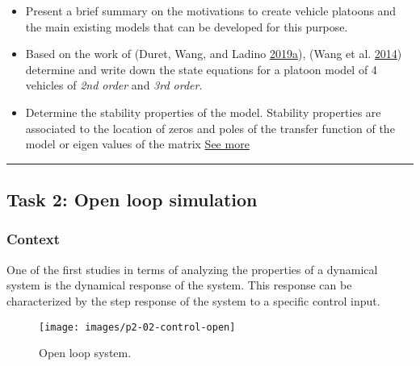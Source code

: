 \documentclass[]{book}
\providecommand{\tightlist}{%
  \setlength{\itemsep}{0pt}\setlength{\parskip}{0pt}}
\theoremstyle{definition}
\theoremstyle{definition}
\theoremstyle{definition}
\theoremstyle{remark}
\begin{document}
\begin{itemize}
\tightlist
\item
  Present a brief summary on the motivations to create vehicle platoons
  and the main existing models that can be developed for this purpose.
\item
  Based on the work of (Duret, Wang, and Ladino
  \protect\hyperlink{ref-Duret2019:ISTTT}{2019}\protect\hyperlink{ref-Duret2019:ISTTT}{a}),
  (Wang et al. \protect\hyperlink{ref-Meng2014b:TR-C}{2014}) determine
  and write down the state equations for a platoon model of 4 vehicles
  of \emph{2nd order} and \emph{3rd order}.\\
\item
  Determine the stability properties of the model. Stability properties
  are associated to the location of zeros and poles of the transfer
  function of the model or eigen values of the matrix
  \href{https://en.wikipedia.org/wiki/Stability_theory}{See more}
\end{itemize}

\begin{center}\rule{0.5\linewidth}{\linethickness}\end{center}

\hypertarget{task-2-open-loop-simulation}{%
\subsection*{Task 2: Open loop
simulation}\label{task-2-open-loop-simulation}}

\hypertarget{context-6}{%
\subsubsection*{Context}\label{context-6}}

One of the first studies in terms of analyzing the properties of a
dynamical system is the dynamical response of the system. This response
can be characterized by the step response of the system to a specific
control input.



\begin{figure}

{\centering \texttt{[image: images/p2-02-control-open]} 

}

\caption{Open loop system.}\label{fig:opencav}
\end{figure}
\end{document}
